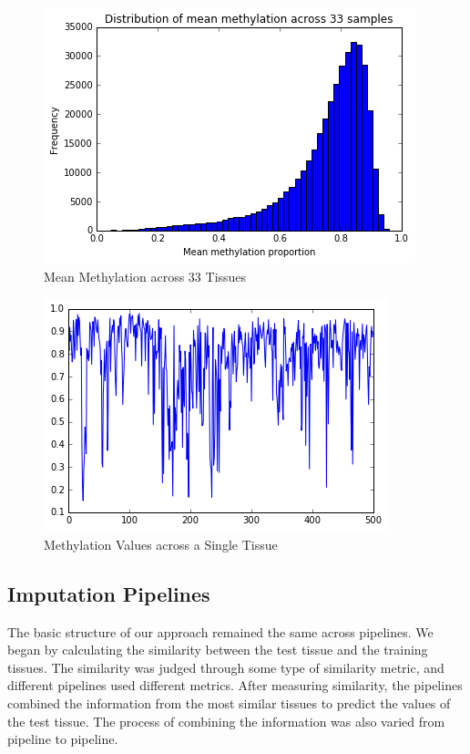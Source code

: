 \documentclass{article} %
\begin{document}
\begin{figure}[!ht]
\begin{center}
\caption{Mean Methylation across 33 Tissues}
\begin{minipage}[b]{0.40\linewidth}
	\includegraphics[scale=0.4]{MeanMethylations.png}
\end{minipage}
\end{center}
\end{figure}

\begin{figure}[!ht]
\begin{center}
\caption{Methylation Values across a Single Tissue}
\begin{minipage}[b]{0.40\linewidth}
	\includegraphics[scale=0.4]{GraphMethylationValues.png}
\end{minipage}
\end{center}
\end{figure}

\subsection{Imputation Pipelines}
The basic structure of our approach remained the same across pipelines. We began by calculating the similarity between the test tissue and the training tissues. The similarity was judged through some type of similarity metric, and different pipelines used different metrics. After measuring similarity, the pipelines combined the information from the most similar tissues to predict the values of the test tissue. The process of combining the information was also varied from pipeline to pipeline.
\end{document}

